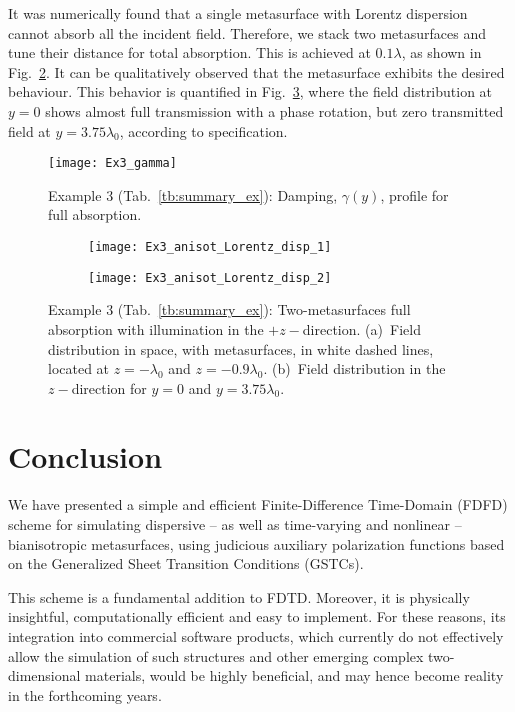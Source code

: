 \documentclass[journal]{IEEEtran}
\begin{document}
It was numerically found that a single metasurface with Lorentz dispersion cannot absorb all the incident field. Therefore, we stack two metasurfaces and tune their distance for total absorption. This is achieved at $0.1\lambda$, as shown in Fig.~\ref{fig:Ex3_anisot_Lorentz_disp_1}. It can be qualitatively observed that the metasurface exhibits the desired behaviour. This behavior is quantified in Fig.~\ref{fig:Ex3_anisot_Lorentz_disp_2}, where the field distribution at $y=0$ shows almost full transmission with a phase rotation, but zero transmitted field at $y=3.75\lambda_0$, according to specification.
\begin{figure}
\centering
\texttt{[image: Ex3\_gamma]}
\caption{Example 3 (Tab.~\ref{tb:summary_ex}): Damping, $\gamma(y)$, profile for full absorption.} \label{fig:Ex3_gamma}
\end{figure}
%
\begin{figure}[!ht]
\centering
\begin{subfigure}{1\columnwidth}
  \centering
  \texttt{[image: Ex3\_anisot\_Lorentz\_disp\_1]}
\caption{}\label{fig:Ex3_anisot_Lorentz_disp_1}
\end{subfigure}

\begin{subfigure}{1\columnwidth}
  \centering
  \texttt{[image: Ex3\_anisot\_Lorentz\_disp\_2]}
 \caption{}\label{fig:Ex3_anisot_Lorentz_disp_2}
\end{subfigure}
\caption{Example 3 (Tab.~\ref{tb:summary_ex}): Two-metasurfaces full absorption with illumination in the $+z-$direction. (a)~Field distribution in space, with metasurfaces, in white dashed lines,  located at $z=-\lambda_0$ and $z=-0.9\lambda_0$. (b)~Field distribution in the $z-$direction for $y=0$ and $y=3.75\lambda_0$.}
\label{fig:Ex3_anisot_Lorentz_disp}
\end{figure}

\section{Conclusion}\label{sec:conclusion}

We have presented a simple and efficient Finite-Difference Time-Domain (FDFD) scheme for simulating dispersive -- as well as time-varying and nonlinear -- bianisotropic metasurfaces, using judicious auxiliary polarization functions based on the Generalized Sheet Transition Conditions (GSTCs).

This scheme is a fundamental addition to FDTD. Moreover, it is physically insightful, computationally efficient and easy to implement. For these reasons, its integration into commercial software products, which currently do not effectively allow the simulation of such structures and other emerging complex two-dimensional materials, would be highly beneficial, and may hence become reality in the forthcoming years.
\end{document}
